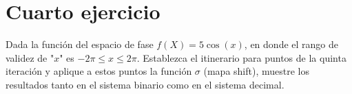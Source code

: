 \documentclass[11pt]{report}
\theoremstyle{plain}
\theoremstyle{definition}
\begin{document}
\section{Cuarto ejercicio}
Dada la función del espacio de fase $f(X) = 5\cos(x)$, en donde el rango de validez de "$x$" es $-2\pi\leq x \leq 2\pi$. Establezca el itinerario para puntos de la quinta iteración y aplique a estos puntos la función $\sigma$ (mapa shift), muestre los resultados tanto en el sistema binario como en el sistema decimal.
\end{document}
